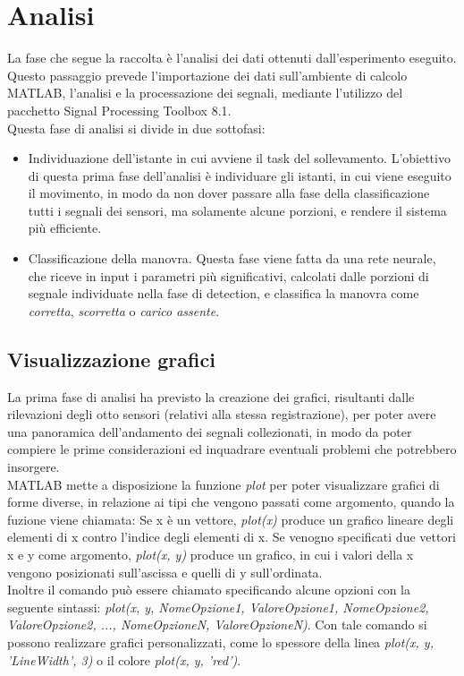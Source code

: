 \documentclass[a4paper, oneside]{book}
\begin{document}
\chapter{Analisi}
La fase che segue la raccolta è l'analisi dei dati ottenuti dall'esperimento eseguito. Questo passaggio prevede l'importazione dei dati sull'ambiente di calcolo MATLAB, l'analisi e la processazione dei segnali, mediante l'utilizzo  del pacchetto Signal Processing Toolbox 8.1. \\
Questa fase di analisi si divide in due sottofasi:
\begin {itemize}
\item Individuazione dell'istante in cui avviene il task del sollevamento. L'obiettivo di questa prima fase dell'analisi è individuare gli istanti, in cui viene eseguito il movimento, in modo da non dover passare alla fase della classificazione tutti i segnali dei sensori, ma solamente alcune porzioni, e rendere il sistema più efficiente.
\item Classificazione della manovra. Questa fase viene fatta da una rete neurale, che riceve in input i parametri più significativi, calcolati dalle porzioni di segnale individuate nella fase di detection, e classifica la manovra come \textit{corretta}, \textit{scorretta} o \textit{carico assente}.
\end{itemize}

\section{Visualizzazione grafici}
La prima fase di analisi ha previsto la creazione dei grafici, risultanti dalle rilevazioni degli otto sensori (relativi alla stessa registrazione), per poter avere una panoramica dell'andamento dei segnali collezionati, in modo da poter compiere le prime considerazioni ed inquadrare eventuali problemi che potrebbero insorgere.\\
MATLAB mette a disposizione la funzione \textit{plot} per poter visualizzare grafici di forme diverse, in relazione ai tipi che vengono passati come argomento, quando la fuzione viene chiamata:  Se x è un vettore, \textit{plot(x)} produce un grafico lineare degli elementi di x contro l’indice degli elementi di x. Se venogno specificati due vettori x e y come argomento,\textit{ plot(x, y) } produce un grafico, in cui i valori della x vengono posizionati sull'ascissa e quelli di y sull'ordinata. \\
Inoltre il comando può essere chiamato specificando alcune opzioni con la seguente sintassi: \textit{plot(x, y, NomeOpzione1, ValoreOpzione1, NomeOpzione2, ValoreOpzione2, ..., NomeOpzioneN, ValoreOpzioneN)}. Con tale comando si possono realizzare grafici personalizzati, come lo spessore della linea \textit{plot(x, y, 'LineWidth', 3)} o il colore \textit{plot(x, y, 'red')}.
\end{document}
